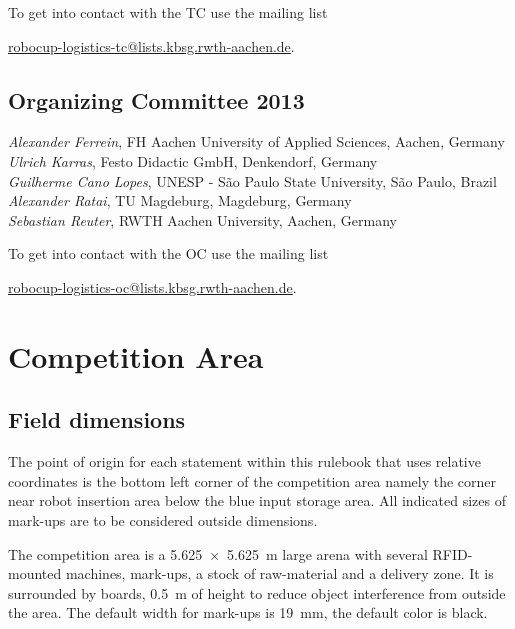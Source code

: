 \documentclass[12pt,twoside]{article}
\begin{document}
\medskip

\noindent
To get into contact with the TC use the mailing list\\
\centerline{\url{robocup-logistics-tc@lists.kbsg.rwth-aachen.de}.}

\subsection{Organizing Committee 2013} \label{sec:oc} 
\emph{Alexander Ferrein}, FH Aachen University of Applied Sciences,
Aachen, Germany\\
\emph{Ulrich Karras}, Festo Didactic GmbH, Denkendorf, Germany\\
\emph{Guilherme Cano Lopes}, UNESP - São Paulo State University, São Paulo,
Brazil\\
\emph{Alexander Ratai}, TU Magdeburg, Magdeburg, Germany\\
\emph{Sebastian Reuter}, RWTH Aachen University, Aachen, Germany

\medskip

\noindent
To get into contact with the OC use the mailing list\\
\centerline{\url{robocup-logistics-oc@lists.kbsg.rwth-aachen.de}.}




\section{Competition Area} \label{sec:area}


\subsection{Field dimensions} \label{sec:competition-area} The point
of origin for each statement within this rulebook that uses relative
coordinates is the bottom left corner of the competition area namely
the corner near robot insertion area below the blue input storage
area. All indicated sizes of mark-ups are to be considered outside
dimensions.

The competition area is a \SI{5.625 x 5.625}{\metre} large arena with
several RFID-mounted machines, mark-ups, a stock of raw-material and a
delivery zone. It is surrounded by boards, \SI{0.5}{\metre} of height
to reduce object interference from outside the area. The default width
for mark-ups is \SI{19}{\milli\metre}, the default color is black.
\end{document}
